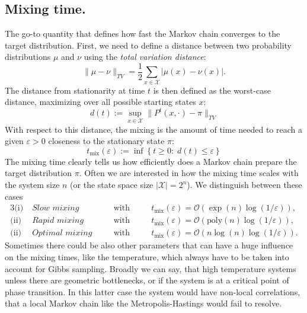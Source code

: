 \subsection{Mixing time.} The go-to quantity that defines how fast the Markov chain converges to the target distribution. First, we need to define a distance between two probability distributions $\mu$ and $\nu$ using the \textit{total variation distance}:
\begin{equation}
    \label{eq:tv-distance}
    \|\mu - \nu\|_{TV} = \frac{1}{2} \sum_{x\in\mathcal{X}} |\mu(x) - \nu(x)|.
\end{equation} 
The distance from stationarity at time $t$ is then defined as the worst-case distance, maximizing over all possible starting states $x$:
\begin{equation}
    \label{eq:convergence-thm}
    d(t) := \sup_{x\in\mathcal{X}} \|P^t(x, \cdot) - \pi\|_{TV} 
\end{equation}
With respect to this distance, the mixing is the amount of time needed to reach a given $\varepsilon>0$ closeness to the stationary state $\pi$:
\begin{equation}
    \label{eq:mixing-time-cl}
    t_\text{mix}(\varepsilon) := \inf\left\{t \geq 0:\; d(t) \leq \varepsilon \right\}
\end{equation}
The mixing time clearly tells us how efficiently does a Markov chain prepare the target distribution $\pi$. Often we are interested in how the mixing time scales with the system size $n$ (or the state space size $|\mathcal{X}| = 2^n$). We distinguish between these cases
\begin{alignat*}{3}
    \text{(i)}\;   &\textit{Slow mixing}  &\quad& \text{with} &\quad& t_\text{mix}(\varepsilon) = \mathcal{O}(\exp(n) \log(1/\varepsilon)), \\
    \text{(ii)}\; &\textit{Rapid mixing}  &\quad& \text{with} &\quad& t_\text{mix}(\varepsilon) = \mathcal{O}(\mathrm{poly}(n) \log(1/\varepsilon)),\\
    \text{(ii)}\; &\textit{Optimal mixing}  &\quad& \text{with} &\quad& t_\text{mix}(\varepsilon) = \mathcal{O}(n \log(n) \log(1/\varepsilon)).
\end{alignat*}
Sometimes there could be also other parameters that can have a huge influence on the mixing times, like the temperature, which always have to be taken into account for Gibbs sampling. 
Broadly we can say, that high temperature systems unless there are geometric bottlenecks, or if the system is at a critical point of phase transition. In this latter case the system would have non-local correlations, that a local Markov chain like the Metropolis-Hastings would fail to resolve.

